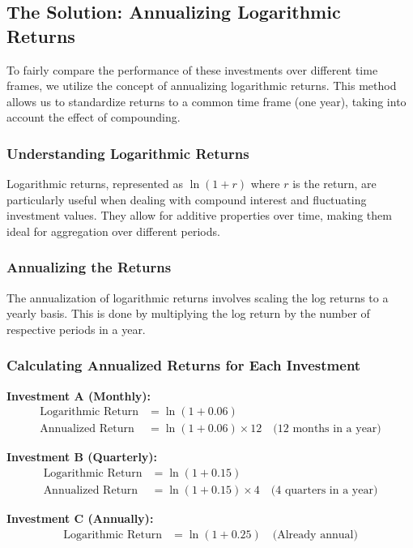 \documentclass{article}
\begin{document}
\subsection{The Solution: Annualizing Logarithmic Returns}

To fairly compare the performance of these investments over different time frames, we utilize the concept of annualizing logarithmic returns. This method allows us to standardize returns to a common time frame (one year), taking into account the effect of compounding.

\subsubsection*{Understanding Logarithmic Returns}

Logarithmic returns, represented as $\ln(1 + r)$ where $r$ is the return, are particularly useful when dealing with compound interest and fluctuating investment values. They allow for additive properties over time, making them ideal for aggregation over different periods.

\subsubsection*{Annualizing the Returns}

The annualization of logarithmic returns involves scaling the log returns to a yearly basis. This is done by multiplying the log return by the number of respective periods in a year.

\subsubsection*{Calculating Annualized Returns for Each Investment}

\textbf{Investment A (Monthly):}
\begin{align*}
    \text{Logarithmic Return} &= \ln(1 + 0.06) \\
    \text{Annualized Return} &= \ln(1 + 0.06) \times 12 \quad \text{(12 months in a year)}
\end{align*}

\textbf{Investment B (Quarterly):}
\begin{align*}
    \text{Logarithmic Return} &= \ln(1 + 0.15) \\
    \text{Annualized Return} &= \ln(1 + 0.15) \times 4 \quad \text{(4 quarters in a year)}
\end{align*}

\textbf{Investment C (Annually):}
\begin{align*}
    \text{Logarithmic Return} &= \ln(1 + 0.25) \quad \text{(Already annual)}
\end{align*}
\end{document}
